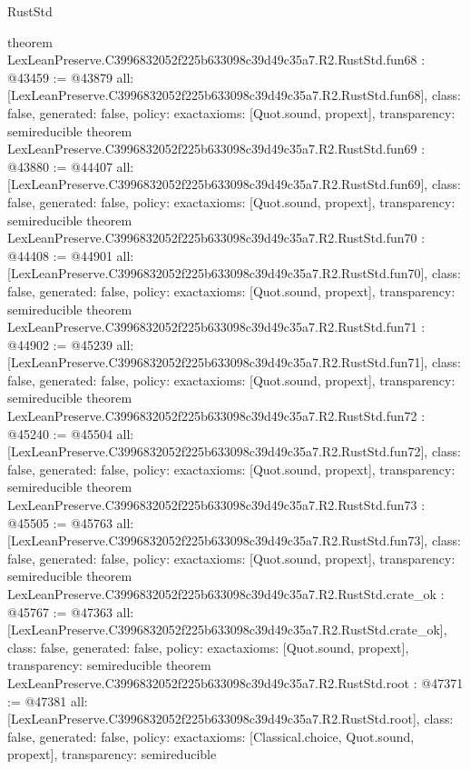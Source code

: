 \begin{lexlean}{RustStd}
\begin{coremodule}
{}
theorem LexLeanPreserve.C3996832052f225b633098c39d49c35a7.R2.RustStd.fun68 : @43459 := @43879 {
  all: [LexLeanPreserve.C3996832052f225b633098c39d49c35a7.R2.RustStd.fun68],
  class: false,
  generated: false,
  policy: exact{axioms: [Quot.sound, propext]},
  transparency: semireducible
}
theorem LexLeanPreserve.C3996832052f225b633098c39d49c35a7.R2.RustStd.fun69 : @43880 := @44407 {
  all: [LexLeanPreserve.C3996832052f225b633098c39d49c35a7.R2.RustStd.fun69],
  class: false,
  generated: false,
  policy: exact{axioms: [Quot.sound, propext]},
  transparency: semireducible
}
theorem LexLeanPreserve.C3996832052f225b633098c39d49c35a7.R2.RustStd.fun70 : @44408 := @44901 {
  all: [LexLeanPreserve.C3996832052f225b633098c39d49c35a7.R2.RustStd.fun70],
  class: false,
  generated: false,
  policy: exact{axioms: [Quot.sound, propext]},
  transparency: semireducible
}
theorem LexLeanPreserve.C3996832052f225b633098c39d49c35a7.R2.RustStd.fun71 : @44902 := @45239 {
  all: [LexLeanPreserve.C3996832052f225b633098c39d49c35a7.R2.RustStd.fun71],
  class: false,
  generated: false,
  policy: exact{axioms: [Quot.sound, propext]},
  transparency: semireducible
}
theorem LexLeanPreserve.C3996832052f225b633098c39d49c35a7.R2.RustStd.fun72 : @45240 := @45504 {
  all: [LexLeanPreserve.C3996832052f225b633098c39d49c35a7.R2.RustStd.fun72],
  class: false,
  generated: false,
  policy: exact{axioms: [Quot.sound, propext]},
  transparency: semireducible
}
theorem LexLeanPreserve.C3996832052f225b633098c39d49c35a7.R2.RustStd.fun73 : @45505 := @45763 {
  all: [LexLeanPreserve.C3996832052f225b633098c39d49c35a7.R2.RustStd.fun73],
  class: false,
  generated: false,
  policy: exact{axioms: [Quot.sound, propext]},
  transparency: semireducible
}
theorem LexLeanPreserve.C3996832052f225b633098c39d49c35a7.R2.RustStd.crate_ok : @45767 := @47363 {
  all: [LexLeanPreserve.C3996832052f225b633098c39d49c35a7.R2.RustStd.crate_ok],
  class: false,
  generated: false,
  policy: exact{axioms: [Quot.sound, propext]},
  transparency: semireducible
}
theorem LexLeanPreserve.C3996832052f225b633098c39d49c35a7.R2.RustStd.root : @47371 := @47381 {
  all: [LexLeanPreserve.C3996832052f225b633098c39d49c35a7.R2.RustStd.root],
  class: false,
  generated: false,
  policy: exact{axioms: [Classical.choice, Quot.sound, propext]},
  transparency: semireducible
}


\end{coremodule}
\end{lexlean}

